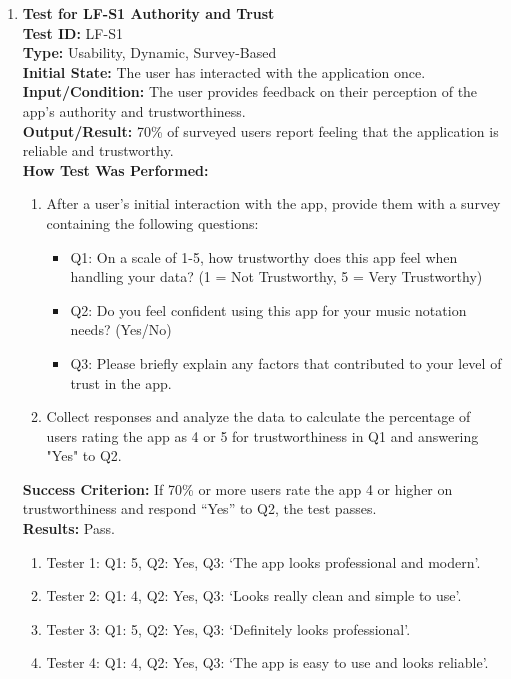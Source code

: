 \documentclass[12pt, titlepage]{article}
\begin{document}
\begin{enumerate}
    \item \textbf{Test for LF-S1 Authority and Trust} \\
      \newline
      \textbf{Test ID:} LF-S1 \\
      \textbf{Type:} Usability, Dynamic, Survey-Based \\
      \textbf{Initial State:} The user has interacted with the application once. \\
      \textbf{Input/Condition:} The user provides feedback on their perception of the app’s authority and trustworthiness. \\
      \textbf{Output/Result:} 70\% of surveyed users report feeling that the application is reliable and trustworthy. \\
      \textbf{How Test Was Performed:}
      \begin{enumerate}
          \item After a user’s initial interaction with the app, provide them with a survey containing the following questions:
          \begin{itemize}
              \item Q1: On a scale of 1-5, how trustworthy does this app feel when handling your data? (1 = Not Trustworthy, 5 = 
              Very Trustworthy)
              \item Q2: Do you feel confident using this app for your music notation needs? (Yes/No)
              \item Q3: Please briefly explain any factors that contributed to your level of trust in the app.
          \end{itemize}
          \item Collect responses and analyze the data to calculate the percentage of users rating the app as 4 or 5 for 
          trustworthiness in Q1 and answering "Yes" to Q2.
      \end{enumerate}
      \textbf{Success Criterion:} If 70\% or more users rate the app 4 or higher on trustworthiness and respond “Yes” to Q2, the 
      test passes.\\
      \textbf{Results:} Pass.
      \begin{enumerate}
        \item Tester 1: Q1: 5, Q2: Yes, Q3: `The app looks professional and modern'.
        \item Tester 2: Q1: 4, Q2: Yes, Q3: `Looks really clean and simple to use'.  
        \item Tester 3: Q1: 5, Q2: Yes, Q3: `Definitely looks professional'.
        \item Tester 4: Q1: 4, Q2: Yes, Q3: `The app is easy to use and looks reliable'.
      \end{enumerate}
\end{enumerate}
\end{document}
